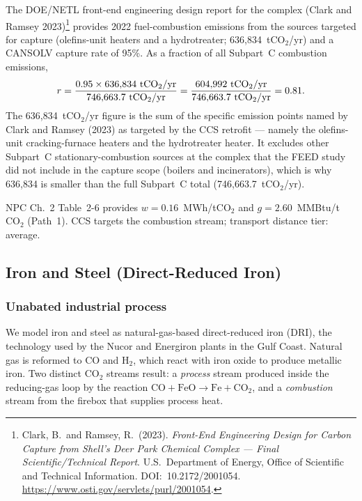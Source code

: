 \documentclass[11pt]{article}
\newcommand{\cotwo}{\ensuremath{\mathrm{CO_2}}}
\begin{document}
The DOE/NETL front-end engineering design report for the complex (Clark and Ramsey 2023)\footnote{Clark, B.\ and Ramsey, R.\ (2023). \emph{Front-End Engineering Design for Carbon Capture from Shell's Deer Park Chemical Complex --- Final Scientific/Technical Report}. U.S.\ Department of Energy, Office of Scientific and Technical Information. DOI:~10.2172/2001054. \url{https://www.osti.gov/servlets/purl/2001054}.} provides 2022 fuel-combustion emissions from the sources targeted for capture (olefins-unit heaters and a hydrotreater; 636{,}834~t\cotwo{}/yr) and a CANSOLV capture rate of 95\%. As a fraction of all Subpart~C combustion emissions,
%
\[
  r = \frac{0.95 \times 636{,}834~\text{t\cotwo{}/yr}}{746{,}663.7~\text{t\cotwo{}/yr}} = \frac{604{,}992~\text{t\cotwo{}/yr}}{746{,}663.7~\text{t\cotwo{}/yr}} = 0.81.
\]
%
The 636{,}834~t\cotwo{}/yr figure is the sum of the specific emission points named by Clark and Ramsey (2023) as targeted by the CCS retrofit --- namely the olefins-unit cracking-furnace heaters and the hydrotreater heater. It excludes other Subpart~C stationary-combustion sources at the complex that the FEED study did not include in the capture scope (boilers and incinerators), which is why 636{,}834 is smaller than the full Subpart~C total (746{,}663.7~t\cotwo{}/yr).

NPC Ch.~2 Table~2-6 provides $w = 0.16$~MWh/t\cotwo{} and $g = 2.60$~MMBtu/t\cotwo{} (Path~1). CCS targets the combustion stream; transport distance tier: average.

\subsection{Iron and Steel (Direct-Reduced Iron)}
\label{sec:const_steel}

\subsubsection{Unabated industrial process}

We model iron and steel as natural-gas-based direct-reduced iron (DRI), the technology used by the Nucor and Energiron plants in the Gulf Coast. Natural gas is reformed to CO and H$_2$, which react with iron oxide to produce metallic iron. Two distinct CO$_2$ streams result: a \emph{process} stream produced inside the reducing-gas loop by the reaction $\text{CO} + \text{FeO} \rightarrow \text{Fe} + \text{CO}_2$, and a \emph{combustion} stream from the firebox that supplies process heat.
\end{document}
